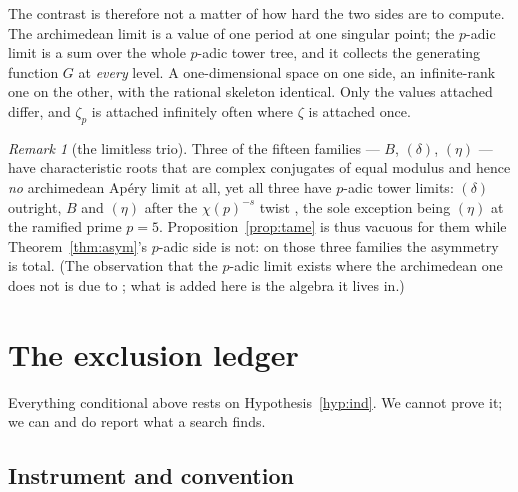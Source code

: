 \documentclass[11pt,reqno]{article}
\theoremstyle{plain}
\theoremstyle{definition}
\theoremstyle{remark}
\newtheorem{remark}[theorem]{Remark}
\numberwithin{equation}{section}
\begin{document}
The contrast is therefore not a matter of how hard the two sides are to compute.
The archimedean limit is a value of one period at one singular point; the
$p$-adic limit is a sum over the whole $p$-adic tower tree, and it collects the
generating function $G$ at \emph{every} level.  A one-dimensional space on one
side, an infinite-rank one on the other, with the rational skeleton identical.
Only the values attached differ, and $\zeta_p$ is attached infinitely often
where $\zeta$ is attached once.

\begin{remark}[the limitless trio]
Three of the fifteen families --- $B$, $(\delta)$, $(\eta)$ --- have
characteristic roots that are complex conjugates of equal modulus and hence
\emph{no} archimedean Ap\'ery limit at all, yet all three have $p$-adic tower
limits: $(\delta)$ outright, $B$ and $(\eta)$ after the $\chi(p)^{-s}$ twist
\cite[\S7]{PaperC}, the sole exception being $(\eta)$ at the ramified prime
$p=5$.  Proposition~\ref{prop:tame} is thus vacuous for them while
Theorem~\ref{thm:asym}'s $p$-adic side is not: on those three families the
asymmetry is total.  (The observation that the $p$-adic limit exists where the
archimedean one does not is due to \cite[\S8.2]{PaperA}; what is added here is
the algebra it lives in.)
\end{remark}

\section{The exclusion ledger}\label{sec:ledger}

Everything conditional above rests on Hypothesis~\ref{hyp:ind}.  We cannot prove
it; we can and do report what a search finds.

\subsection{Instrument and convention}
\end{document}
